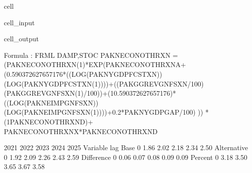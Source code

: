 \documentclass[letterpaper,10pt,english]{jupyterBook}
\begin{document}
\begin{sphinxuseclass}{cell}\begin{sphinxVerbatimInput}

\begin{sphinxuseclass}{cell_input}
\begin{sphinxVerbatim}[commandchars=\\\{\}]
 
    \PYG{p}{[}\PYG{p}{]}
\end{sphinxVerbatim}

\end{sphinxuseclass}\end{sphinxVerbatimInput}
\begin{sphinxVerbatimOutput}

\begin{sphinxuseclass}{cell_output}
\begin{sphinxVerbatim}[commandchars=\\\{\}]
Formula        : FRML \PYGZlt{}DAMP,STOC\PYGZgt{} PAKNECONOTHRXN = (PAKNECONOTHRXN(\PYGZhy{}1)*EXP(PAKNECONOTHRXN\PYGZus{}A+ (0.590372627657176*((LOG(PAKNYGDPFCSTXN))\PYGZhy{}(LOG(PAKNYGDPFCSTXN(\PYGZhy{}1))))+((PAKGGREVGNFSXN/100)\PYGZhy{}(PAKGGREVGNFSXN(\PYGZhy{}1)/100))+(1\PYGZhy{}0.590372627657176)*((LOG(PAKNEIMPGNFSXN))\PYGZhy{}(LOG(PAKNEIMPGNFSXN(\PYGZhy{}1))))+0.2*PAKNYGDPGAP\PYGZus{}/100) )) * (1\PYGZhy{}PAKNECONOTHRXN\PYGZus{}D)+ PAKNECONOTHRXN\PYGZus{}X*PAKNECONOTHRXN\PYGZus{}D  \PYGZdl{} 

                      2021       2022       2023       2024       2025
Variable    lag                                                       
Base        0         1.86       2.02       2.18       2.34       2.50
Alternative 0         1.92       2.09       2.26       2.43       2.59
Difference  0         0.06       0.07       0.08       0.09       0.09
Percent     0         3.18       3.50       3.65       3.67       3.58


\end{sphinxVerbatim}
\end{sphinxuseclass}
\end{sphinxVerbatimOutput}
\end{sphinxuseclass}
\end{document}
